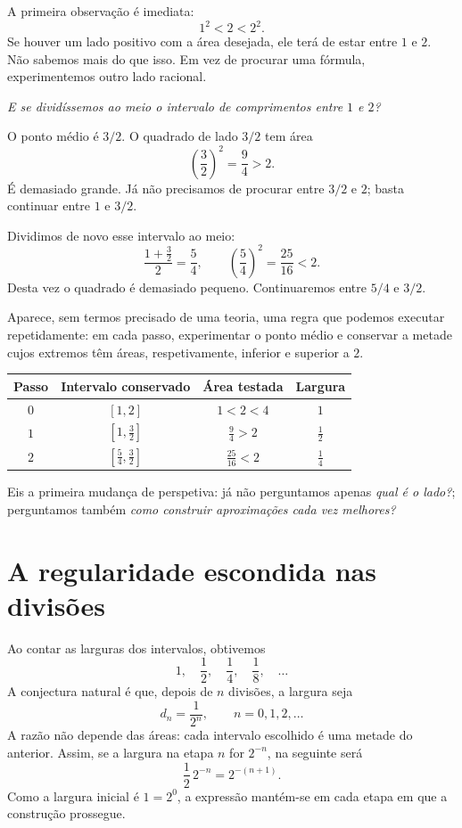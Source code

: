 \documentclass[11pt,a4paper]{article}
\newcommand{\questao}[1]{\par\medskip\noindent\textit{#1}\par\smallskip}
\begin{document}
A primeira observação é imediata:
\[
1^2<2<2^2.
\]
Se houver um lado positivo com a área desejada, ele terá de estar entre $1$ e $2$. Não sabemos mais do que isso. Em vez de procurar uma fórmula, experimentemos outro lado racional.

\questao{E se dividíssemos ao meio o intervalo de comprimentos entre $1$ e $2$?}

O ponto médio é $3/2$. O quadrado de lado $3/2$ tem área
\[
\left(\frac32\right)^2=\frac94>2.
\]
É demasiado grande. Já não precisamos de procurar entre $3/2$ e $2$; basta continuar entre $1$ e $3/2$.

Dividimos de novo esse intervalo ao meio:
\[
\frac{1+\frac32}{2}=\frac54,
\qquad
\left(\frac54\right)^2=\frac{25}{16}<2.
\]
Desta vez o quadrado é demasiado pequeno. Continuaremos entre $5/4$ e $3/2$.

Aparece, sem termos precisado de uma teoria, uma regra que podemos executar repetidamente: em cada passo, experimentar o ponto médio e conservar a metade cujos extremos têm áreas, respetivamente, inferior e superior a $2$.

\begin{center}
\begin{tabular}{@{}c c c c@{}}
\toprule
Passo & Intervalo conservado & Área testada & Largura \\
\midrule
$0$ & $[1,2]$ & $1<2<4$ & $1$ \\
$1$ & $[1,\frac32]$ & $\frac94>2$ & $\frac12$ \\
$2$ & $[\frac54,\frac32]$ & $\frac{25}{16}<2$ & $\frac14$ \\
\bottomrule
\end{tabular}
\end{center}

Eis a primeira mudança de perspetiva: já não perguntamos apenas \emph{qual é o lado?}; perguntamos também \emph{como construir aproximações cada vez melhores?}

\section{A regularidade escondida nas divisões}

Ao contar as larguras dos intervalos, obtivemos
\[
1,\quad\frac12,\quad\frac14,\quad\frac18,\quad\ldots
\]
A conjectura natural é que, depois de $n$ divisões, a largura seja
\[
d_n=\frac{1}{2^n},\qquad n=0,1,2,\ldots
\]
A razão não depende das áreas: cada intervalo escolhido é uma metade do anterior. Assim, se a largura na etapa $n$ for $2^{-n}$, na seguinte será
\[
\frac12\,2^{-n}=2^{-(n+1)}.
\]
Como a largura inicial é $1=2^0$, a expressão mantém-se em cada etapa em que a construção prossegue.
\end{document}
